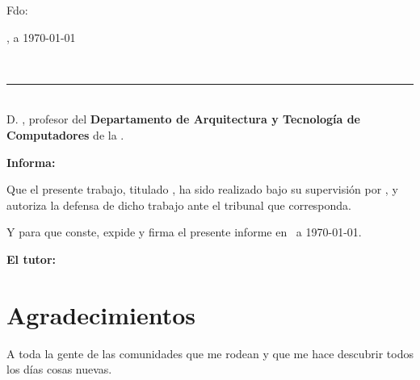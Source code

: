 \vspace{4cm}

\noindent Fdo: \autor

\vspace{2cm}

\begin{flushright}
\ciudad, a \today
\end{flushright}

\newpage
\thispagestyle{empty}
\
\vspace{3cm}

\noindent\rule[-1ex]{\textwidth}{2pt}\\[4.5ex]

D. \textbf{\tutor}, profesor del \textbf{Departamento de Arquitectura y Tecnología de Computadores} de la \textbf{\universidad}.

\vspace{0.5cm}

\vspace{0.5cm}

\textbf{Informa:}

\vspace{0.5cm}

Que el presente trabajo, titulado \textit{\textbf{\titulo}}, ha sido realizado bajo su supervisión por \textbf{\autor}, y 
autoriza la defensa de dicho trabajo ante el tribunal que corresponda.

\vspace{0.5cm}

Y para que conste, expide y firma el presente informe en \ciudad\ a \today.

\vspace{1cm}

\textbf{El tutor:}

\vspace{5cm}

\noindent \textbf{\tutor}

\chapter*{Agradecimientos}
\thispagestyle{empty}

\vspace{1cm}

A toda la gente de las comunidades que me rodean y que me hace descubrir todos los días cosas nuevas.
